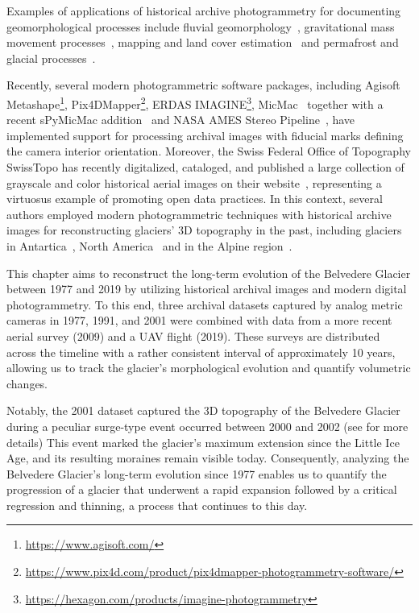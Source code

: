 Examples of applications of historical archive photogrammetry for documenting geomorphological processes include fluvial geomorphology~\citep{Bakker2017, lane2010quantification}, gravitational mass movement processes~\citep{chandler1995steady, walstra2007historical, schwab2008landsliding}, mapping and land cover estimation~\citep{Giordano2018} and permafrost and glacial processes~\citep{kaab2002monitoring, Kaufmann2003, keutterling2006monitoring, mondino2008multi, Fischer2011}.

Recently, several modern photogrammetric software packages, including Agisoft Metashape\footnote{\url{https://www.agisoft.com/}}, Pix4DMapper\footnote{\url{https://www.pix4d.com/product/pix4dmapper-photogrammetry-software/}}, ERDAS IMAGINE\footnote{\url{https://hexagon.com/products/imagine-photogrammetry}}, MicMac~\citep{rupnik2017micmac, Zhang2021} together with a recent sPyMicMac addition~\citep{McNabb2020} and NASA AMES Stereo Pipeline~\citep{Beyer2018}, have implemented support for processing archival images with fiducial marks defining the camera interior orientation. 
Moreover, the Swiss Federal Office of Topography SwissTopo has recently digitalized, cataloged, and published a large collection of grayscale and color historical aerial images on their website~\citep{Heisig2021}, representing a virtuosus example of promoting open data practices.
In this context, several authors employed modern photogrammetric techniques with historical archive images for reconstructing glaciers' 3D topography in the past, including glaciers in Antartica~\citep{Child2021, Dahle2024}, North America~\citep{Knuth2023} and in the Alpine region~\citep{Molg2017, poli2020use}.

This chapter aims to reconstruct the long-term evolution of the Belvedere Glacier between 1977 and 2019 by utilizing historical archival images and modern digital photogrammetry.
To this end, three archival datasets captured by analog metric cameras in 1977, 1991, and 2001 were combined with data from a more recent aerial survey (2009) and a UAV flight (2019).
These surveys are distributed across the timeline with a rather consistent interval of approximately 10 years, allowing us to track the glacier's morphological evolution and quantify volumetric changes. 

Notably, the 2001 dataset captured the 3D topography of the Belvedere Glacier during a peculiar surge-type event \citep{Haeberli2002} occurred between 2000 and 2002 (see  for more  details)
This event marked the glacier's maximum extension since the Little Ice Age, and its resulting moraines remain visible today.
Consequently, analyzing the Belvedere Glacier's long-term evolution since 1977 enables us to quantify the progression of a glacier that underwent a rapid expansion followed by a critical regression and thinning, a process that continues to this day.

